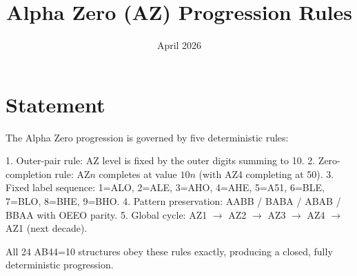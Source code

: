 \documentclass{article}
\title{Alpha Zero (AZ) Progression Rules}
\date{April 2026}
\begin{document}
\maketitle

\section{Statement}

The Alpha Zero progression is governed by five deterministic rules:

1. Outer-pair rule: AZ level is fixed by the outer digits summing to 10.
2. Zero-completion rule: AZ$n$ completes at value $10n$ (with AZ4 completing at 50).
3. Fixed label sequence: 1=ALO, 2=ALE, 3=AHO, 4=AHE, 5=A51, 6=BLE, 7=BLO, 8=BHE, 9=BHO.
4. Pattern preservation: AABB / BABA / ABAB / BBAA with OEEO parity.
5. Global cycle: AZ1 $\to$ AZ2 $\to$ AZ3 $\to$ AZ4 $\to$ AZ1 (next decade).

All 24 AB44=10 structures obey these rules exactly, producing a closed, fully deterministic progression.
\end{document}
